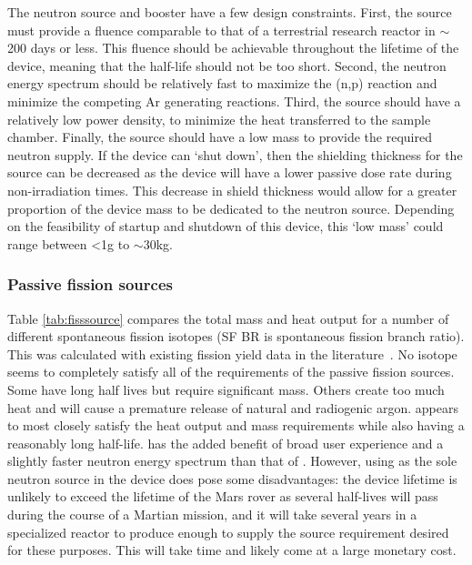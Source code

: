 \documentclass{mc2015}
\begin{document}
The neutron source and booster have a few design constraints. First, the source must provide a fluence comparable to that of a terrestrial research reactor in $\sim$200 days or less. This fluence should be achievable throughout the lifetime of the device, meaning that the half-life should not be too short. Second, the neutron energy spectrum should be relatively fast to maximize the (n,p) reaction and minimize the competing Ar generating reactions. Third, the source should have a relatively low power density, to minimize the heat transferred to the sample chamber. Finally, the source should have a low mass to provide the required neutron supply. If the device can `shut down', then the shielding thickness for the source can be decreased as the device will have a lower passive dose rate during non-irradiation times. This decrease in shield thickness would allow for a greater proportion of the device mass to be dedicated to the neutron source. Depending on the feasibility of startup and shutdown of this device, this `low mass' could range between <1g to $\sim$30kg. 

\subsubsection{Passive fission sources}

Table \ref{tab:fisssource} compares the total mass and heat output for a number of different spontaneous fission isotopes (SF BR is spontaneous fission branch ratio). This was calculated with existing fission yield data in the literature~\cite{england_evaluation_1995, axton_neutron_1985}.
No isotope seems to completely satisfy all of the requirements of the passive fission sources. Some have long half lives but require significant mass. Others create too much heat and will cause a premature release of natural and radiogenic argon.  appears to most closely satisfy the heat output and mass requirements while also having a reasonably long half-life.  has the added benefit of broad user experience \cite{martin_production_2000} and a slightly faster neutron energy spectrum than that of  \cite{hjalmar_energy_1955}. However, using  as the sole neutron source in the device does pose some disadvantages: the device lifetime is unlikely to exceed the lifetime of the Mars rover as several half-lives will pass during the course of a Martian mission, and it will take several years in a specialized reactor to produce enough  to supply the source requirement desired for these purposes. This will take time and likely come at a large monetary cost. 
\end{document}
